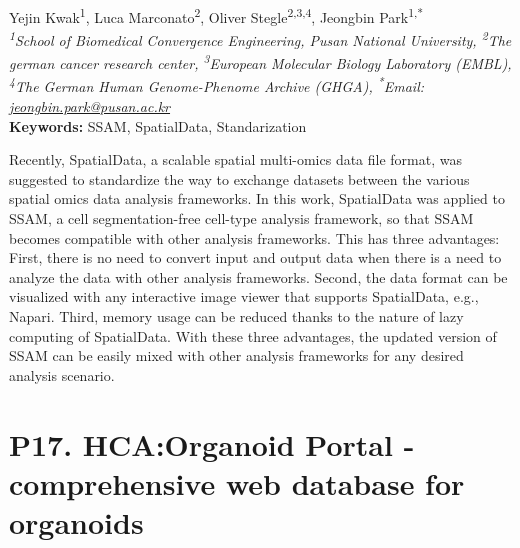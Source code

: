 \begin{center}
Yejin Kwak\href{https://orcid.org/0009-0006-0892-9211}{\textcolor{orcidlogocol}{\aiOrcid}}\textsuperscript{1}, Luca Marconato\href{https://orcid.org/0000-0003-3198-1326}{\textcolor{orcidlogocol}{\aiOrcid}}\textsuperscript{2}, Oliver Stegle\href{https://orcid.org/0000-0002-8818-7193}{\textcolor{orcidlogocol}{\aiOrcid}}\textsuperscript{2,3,4}, Jeongbin Park\href{https://orcid.org/0000-0002-9064-4912}{\textcolor{orcidlogocol}{\aiOrcid}}\textsuperscript{1,*} \\
\vspace{0.2cm}
\textit{\textsuperscript{1}School of Biomedical Convergence Engineering, Pusan National University, \textsuperscript{2}The german cancer research center, \textsuperscript{3}European Molecular Biology Laboratory (EMBL), \textsuperscript{4}The German Human Genome-Phenome Archive (GHGA), \textsuperscript{*}Email: \href{mailto:jeongbin.park@pusan.ac.kr}{jeongbin.park@pusan.ac.kr}} \\
\vspace{0.2cm}
\textbf{Keywords:} SSAM, SpatialData, Standarization
\end{center}

\noindent
Recently, SpatialData, a scalable spatial multi-omics data file format, was suggested to standardize the way to exchange datasets between the various spatial omics data analysis frameworks. In this work, SpatialData was applied to SSAM, a cell segmentation-free cell-type analysis framework, so that SSAM becomes compatible with other analysis frameworks. This has three advantages: First, there is no need to convert input and output data when there is a need to analyze the data with other analysis frameworks. Second, the data format can be visualized with any interactive image viewer that supports SpatialData, e.g., Napari. Third, memory usage can be reduced thanks to the nature of lazy computing of SpatialData. With these three advantages, the updated version of SSAM can be easily mixed with other analysis frameworks for any desired analysis scenario.
\newpage


\section*{P17. HCA:Organoid Portal - comprehensive web database for organoids}

